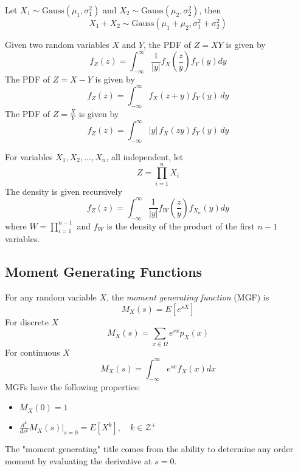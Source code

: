 Let $X_1 \sim \text{Gauss}(\mu_1, \sigma_1^2)$ and
$X_2 \sim \text{Gauss}(\mu_2, \sigma_2^2)$, then
\begin{equation}
    X_1 + X_2 \sim \text{Gauss}\left( \mu_1 + \mu_2, \sigma_1^2 + \sigma_2^2 \right)
\end{equation}

Given two random variables $X$ and $Y$, the
PDF of $Z = XY$ is given by
\begin{equation}
    f_Z(z) = \int_{-\infty}^{\infty} \frac{1}{|y|} f_X(\frac{z}{y}) f_Y(y) dy
\end{equation}
The PDF of $Z = X - Y$ is given by
\begin{equation}
    f_Z(z) = \int_{-\infty}^{\infty} f_X(z + y) f_Y(y) \, dy
\end{equation}
The PDF of $Z = \frac{X}{Y}$ is given by
\begin{equation}
    f_Z(z) = \int_{-\infty}^{\infty} |y| \, f_X(z y) f_Y(y) \, dy
\end{equation}

For variables $X_1, X_2, \dots, X_n$, all
independent, let
\begin{equation}
    Z = \prod_{i = 1}^{n} X_i
\end{equation}
The density is given recursively
\begin{equation}
    f_Z(z) = \int_{-\infty}^{\infty} \frac{1}{|y|} f_W(\frac{z}{y}) f_{X_n}(y) dy
\end{equation}
where $W = \prod_{i=1}^{n-1}$ and $f_W$ is the
density of the product of the first $n - 1$ variables.

\subsection{Moment Generating Functions}
For any random variable $X$, the \emph{moment generating function}
(MGF) is
\begin{equation}
    M_X(s) = E\left[e^{sX}\right]
\end{equation}
For discrete $X$
\begin{equation}
    M_X(s) = \sum_{x\in \Omega} e^{sx} p_X(x)
\end{equation}
For continuous $X$
\begin{equation}
    M_X(s) = \int_{-\infty}^{\infty} e^{sx}f_X(x)dx
\end{equation}
MGFs have the following properties:
\begin{itemize}
    \item $M_X(0) = 1$ \\
    \item $\frac{d^k}{ds^k} M_X(s)\Big|_{s=0} = E\left[X^k\right], \quad k \in \mathcal{Z}^+$
\end{itemize}
The "moment generating" title comes
from the ability to determine any order
moment by evaluating the derivative at $s=0$.

